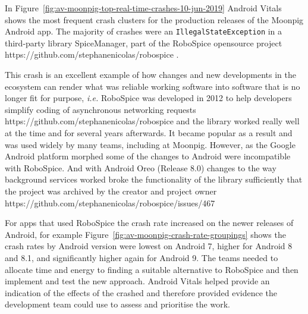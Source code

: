 In Figure~\ref{fig:av-moonpig-top-real-time-crashes-10-jun-2019} Android Vitals shows the most frequent crash clusters for the production releases of the Moonpig Android app. The majority of crashes were an \texttt{IllegalStateException} in a third-party library SpiceManager, part of the RoboSpice opensource project https://github.com/stephanenicolas/robospice . 

This crash is an excellent example of how changes and new developments in the ecosystem can render what was reliable working software into software that is no longer fit for purpose, \emph{i.e.} RoboSpice was developed in 2012 to help developers simplify coding of asynchronous networking requests https://github.com/stephanenicolas/robospice and the library worked really well at the time and for several years afterwards. It became popular as a result and was used widely by many teams, including at Moonpig. However, as the Google Android platform morphed some of the changes to Android were incompatible with RoboSpice. And with Android Oreo (Release 8.0) changes to the way background services worked broke the functionality of the library sufficiently that the project was archived by the creator and project owner https://github.com/stephanenicolas/robospice/issues/467 

For apps that used RoboSpice the crash rate increased on the newer releases of Android, for example Figure~\ref{fig:av-moonpig-crash-rate-groupings} shows the crash rates by Android version were lowest on Android 7, higher for Android 8 and 8.1, and significantly higher again for Android 9. The teams needed to allocate time and energy to finding a suitable alternative to RoboSpice and then implement and test the new approach. Android Vitals helped provide an indication of the effects of the crashed and therefore provided evidence the development team could use to assess and prioritise the work.

